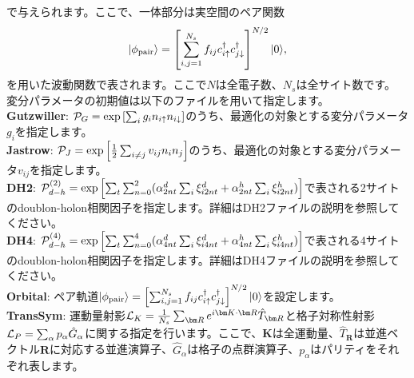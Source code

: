 \begin{description}
\begin{equation}
\end{equation}
で与えられます。ここで、一体部分は実空間のペア関数
\begin{equation}
|\phi_{\rm pair} \rangle = \left[\sum_{i, j=1}^{N_s} f_{ij}c_{i\uparrow}^{\dag}c_{j\downarrow}^{\dag} \right]^{N/2}|0 \rangle,
\end{equation}
を用いた波動関数で表されます。ここで$N$は全電子数、$N_s$は全サイト数です。
変分パラメータの初期値は以下のファイルを用いて指定します。
~\\{\bf Gutzwiller}: ${\cal P}_G=\exp\left[ \sum_i g_i n_{i\uparrow} n_{i\downarrow} \right]$のうち、最適化の対象とする変分パラメータ$g_i$を指定します。
~\\{\bf Jastrow}: ${\cal P}_J=\exp\left[\frac{1}{2} \sum_{i\neq j} v_{ij} n_i n_j\right]$のうち、最適化の対象とする変分パラメータ$v_{ij}$を指定します。
~\\{\bf DH2}:  ${\cal P}_{d-h}^{(2)}= \exp \left[ \sum_t \sum_{n=0}^2 (\alpha_{2nt}^d \sum_{i}\xi_{i2nt}^d+\alpha_{2nt}^h \sum_{i}\xi_{i2nt}^h)\right]$で表される2サイトのdoublon-holon相関因子を指定します。詳細はDH2ファイルの説明を参照してください。
~\\{\bf DH4}:  ${\cal P}_{d-h}^{(4)}= \exp \left[ \sum_t \sum_{n=0}^4 (\alpha_{4nt}^d \sum_{i}\xi_{i4nt}^d+\alpha_{4nt}^h \sum_{i}\xi_{i4nt}^h)\right]$で表される4サイトのdoublon-holon相関因子を指定します。詳細はDH4ファイルの説明を参照してください。
~\\{\bf Orbital}: ペア軌道$|\phi_{\rm pair} \rangle = \left[\sum_{i, j=1}^{N_s} f_{ij}c_{i\uparrow}^{\dag}c_{j\downarrow}^{\dag} \right]^{N/2}|0 \rangle$を設定します。
~\\{\bf TransSym}: 運動量射影${\cal L}_K=\frac{1}{N_s}\sum_{{\bm R}}e^{i {\bm K} \cdot{\bm R} } \hat{T}_{\bm R}$と格子対称性射影${\cal L}_P=\sum_{\alpha}p_{\alpha} \hat{G}_{\alpha}$に関する指定を行います。ここで、${\bm K}$は全運動量、$\hat{T}_{\bm R}$は並進ベクトル${\bm R}$に対応する並進演算子、$\hat{G}_{\alpha}$は格子の点群演算子、$p_\alpha$はパリティをそれぞれ表します。


\end{description}
